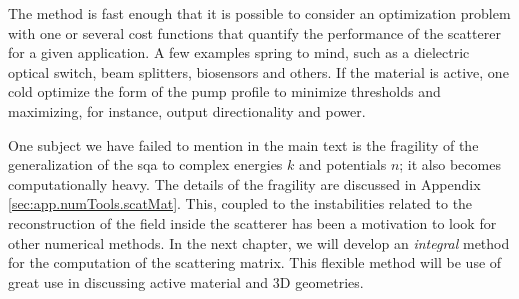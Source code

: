 The method is fast enough that it is possible to consider
an optimization problem with one or several cost functions
that quantify the performance of the scatterer for a
given application. A few examples spring to mind, such as
a dielectric optical switch, beam splitters, biosensors and others. 
If the material is active, one cold optimize the form of the pump 
profile to minimize thresholds and maximizing, for instance, output
directionality and power. 

One subject we have failed to mention in the main text is the 
fragility of the generalization of the \gls{sqa} to complex
energies $k$ and potentials $n$; it also becomes computationally
heavy. The details of the fragility are discussed in Appendix
\ref{sec:app.numTools.scatMat}. This, coupled to the instabilities
related to the reconstruction of the field inside the scatterer
has been a motivation to look for other numerical methods. In 
the next chapter, we will develop an \textit{integral} method
for the computation of the scattering matrix. This flexible
method will be use of great use in discussing active material 
and 3D geometries. 

% 
%   

